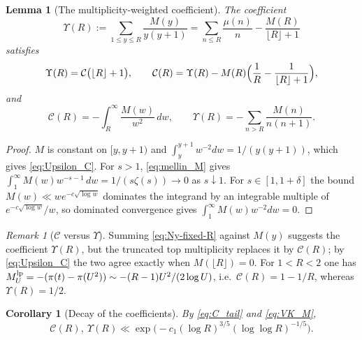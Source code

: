 \documentclass[11pt]{amsart}
\numberwithin{equation}{section}
\theoremstyle{plain}
\newtheorem{lemma}[theorem]{Lemma}
\newtheorem{corollary}[theorem]{Corollary}
\theoremstyle{definition}
\theoremstyle{remark}
\newtheorem{remark}[theorem]{Remark}
\newcommand{\Cc}{\mathcal{C}}
\begin{document}
\begin{lemma}[The multiplicity-weighted coefficient]
\label{lem:copy-weight-coefficient}
The coefficient
\begin{equation}
\label{eq:Upsilon_def}
  \Upsilon(R):=\sum_{1\le y\le R}\frac{M(y)}{y(y+1)}
  =\sum_{n\le R}\frac{\mu(n)}n-\frac{M(R)}{\lfloor R\rfloor+1}
\end{equation}
satisfies
\begin{equation}
\label{eq:Upsilon_C}
  \Upsilon(R)=\Cc\bigl(\lfloor R\rfloor+1\bigr),\qquad
  \Cc(R)=\Upsilon(R)-M(R)\Bigl(\frac1R-\frac1{\lfloor R\rfloor+1}\Bigr),
\end{equation}
and
\begin{equation}
\label{eq:C_tail}
  \Cc(R)=-\int_R^\infty\frac{M(w)}{w^2}\,dw,\qquad
  \Upsilon(R)=-\sum_{n>R}\frac{M(n)}{n(n+1)}.
\end{equation}
\end{lemma}

\begin{proof}
$M$ is constant on $[y,y+1)$ and $\int_y^{y+1}w^{-2}dw=1/(y(y+1))$, which
gives \eqref{eq:Upsilon_C}. For $s>1$, \eqref{eq:mellin_M} gives
$\int_1^\infty M(w)w^{-s-1}\,dw=1/(s\zeta(s))\to0$ as $s\downarrow1$. For
$s\in[1,1+\delta]$ the bound $M(w)\ll we^{-c\sqrt{\log w}}$ dominates the
integrand by an integrable multiple of $e^{-c\sqrt{\log w}}/w$, so dominated
convergence gives $\int_1^\infty M(w)w^{-2}dw=0$.
\end{proof}

\begin{remark}[$\Cc$ versus $\Upsilon$]
\label{rem:C-vs-Upsilon}
Summing \eqref{eq:Ny-fixed-R} against $M(y)$ suggests the coefficient
$\Upsilon(R)$, but the truncated top multiplicity replaces it by $\Cc(R)$; by
\eqref{eq:Upsilon_C} the two agree exactly when $M(\lfloor R\rfloor)=0$. For
$1<R<2$ one has $M^{\rm lp}_U=-(\pi(t)-\pi(U^2))\sim-(R-1)U^2/(2\log U)$, i.e.\
$\Cc(R)=1-1/R$, whereas $\Upsilon(R)=1/2$.
\end{remark}

\begin{corollary}[Decay of the coefficients]
\label{cor:AR-VK}
By \eqref{eq:C_tail} and \eqref{eq:VK_M},
\begin{equation}
\label{eq:AR-VK}
  \Cc(R),\ \Upsilon(R)\ll\exp\bigl(-c_1(\log R)^{3/5}(\log\log R)^{-1/5}\bigr).
\end{equation}
\end{corollary}
\end{document}
